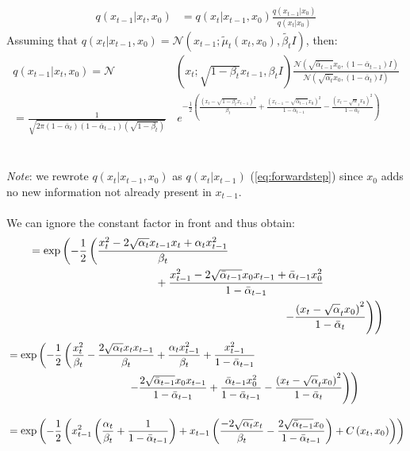 \documentclass[twoside]{article}
\numberwithin{equation}{section}
\numberwithin{figure}{section}
\begin{document}
\begin{align}
  q\left(x_{t-1} | x_t, x_0\right) &= q\left(x_t | x_{t-1}, x_0\right) \frac{q\left(x_{t-1}| x_0\right)}{q\left(x_t | x_0\right)} \label{eq:ddpmbayes}
\end{align}
  Assuming that $q\left(x_t | x_{t-1}, x_0\right) = \mathcal{N}\left(x_{t-1}; \tilde{\mu}_t \left(x_t, x_0\right), \tilde{\beta_t} I\right)$, then:
\begin{align}
  q\left(x_{t-1} | x_t, x_0\right) = \mathcal{N} & \left(x_t; \sqrt{1 - \beta_t}x_{t-1}, \beta_t I\right) \frac{\mathcal{N}\left(\sqrt{\bar{\alpha}_{t-1}} x_0, \left(1 - \bar{\alpha}_{t-1}\right)I\right)}{\mathcal{N}\left(\sqrt{\bar{\alpha}_t} x_0, \left(1 - \bar{\alpha}_t\right)I\right)} \\[15pt]
  = \frac{1}{\sqrt{2 \pi \left(1 - \bar{\alpha}_t\right) \left(1 - \bar{\alpha}_{t-1}\right) \left(\sqrt{1 - \beta_t}\right)}} & \, e^{- \frac{1}{2} \left(\frac{\left(x_t - \sqrt{1 - \beta_t}x_{t-1}\right)^2}{\beta_t} + \frac{\left(x_{t-1} - \sqrt{\bar{\alpha}_{t-1}}x_0\right)^2}{1 - \bar{\alpha}_{t-1}} - \frac{\left(x_t - \sqrt{\alpha}_t x_0\right)^2}{1 - \bar{\alpha}_{t}}\right)}
\end{align}
\\\\
\textit{Note}: we rewrote $q\left(x_t | x_{t-1}, x_0\right)$ as $q\left(x_t | x_{t-1}\right)$ (\ref{eq:forwardstep}) since $x_0$ adds no new information not already \indent \indent present in $x_{t-1}$.
\\\\
We can ignore the constant factor in front and thus obtain:
\begin{align}
  &= \exp\left(- \frac{1}{2} \left(\frac{x_t^2 - 2 \sqrt{\alpha_t} x_{t-1} x_t + \alpha_t x_{t-1}^2}{\beta_t} \right. \right. \\
  & \hspace{4cm} + \frac{x_{t-1}^2 - 2 \sqrt{\bar{\alpha}_{t-1}} x_0 x_{t-1} + \bar{\alpha}_{t-1} x_0^2}{ 1 - \bar{\alpha}_{t-1}}  \notag \\
  & \left. \left. \hspace{8cm} - \frac{\left(x_t - \sqrt{\alpha}_t x_0\right)^2}{1 - \bar{\alpha}_{t}}\right) \right) \notag
\end{align}
\begin{align}
  &= \exp\left(- \frac{1}{2} \left(\frac{x_t^2}{\beta_t} - \frac{2 \sqrt{\alpha_t} x_t x_{t-1}}{\beta_t} + \frac{\alpha_t x_{t-1}^2}{\beta_t} + \frac{x_{t-1}^2}{1 - \bar{\alpha}_{t-1}} \right. \right. \\
  & \left. \left. \hspace{4cm}  - \frac{2 \sqrt{\bar{\alpha}_{t-1}} x_0 x_{t-1}}{1 - \bar{\alpha}_{t-1}} + \frac{\bar{\alpha}_{t-1} x_0^2}{1 - \bar{\alpha}_{t-1}} - \frac{\left(x_t - \sqrt{\alpha}_t x_0\right)^2}{1 - \bar{\alpha}_{t}}\right) \right) \notag \\[10pt]
  &= \exp\left(- \frac{1}{2} \left(x_{t-1}^2 \left(\frac{\alpha_t}{\beta_t} + \frac{1}{1 - \bar{\alpha}_{t-1}}\right) + x_{t-1} \left(\frac{-2 \sqrt{\alpha_t} x_t}{\beta_t} - \frac{2 \sqrt{\bar{\alpha}_{t-1}} x_0 }{1 - \bar{\alpha}_{t-1}}\right) + C\left(x_t, x_0\right)\right) \right) 
\end{align}
\end{document}
